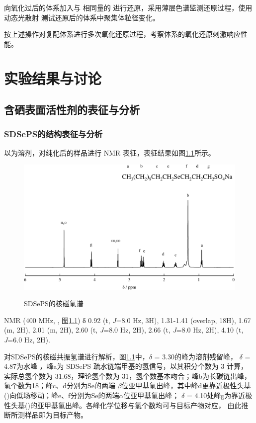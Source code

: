 \documentclass[bachelor,fandolfonts,replaceperiod]{jnuthesis}
\begin{document}
    向氧化过后的体系加入与  相同量的  进行还原，采用薄层色谱监测还原过程，使用动态光散射
    测试还原后的体系中聚集体粒径变化。
    
    按上述操作对复配体系进行多次氧化还原过程，考察体系的氧化还原刺激响应性能。
    
    \chapter{实验结果与讨论}\label{chapter:results}
    \section{含硒表面活性剂的表征与分析}
    \subsection{SDSePS的结构表征与分析}
    以为溶剂，对纯化后的样品进行 NMR 表征，表征结果如图\ref{fig:SDSePS-nmr}所示。
    \begin{figure}[htbp]
        \centering
        \includegraphics[width=.75\textwidth]{figure/SDSePS-nmr.pdf}\\
        \caption{SDSePS的核磁氢谱}\label{fig:SDSePS-nmr}
    \end{figure}
     
     NMR (400 MHz, , 图\ref{fig:SDSePS-nmr}) δ 0.92 (t, \textit{J}=8.0 Hz, 3H), 1.31-1.41 (overlap, 18H), 
    1.67 (m, 2H), 2.01 (m, 2H), 2.60 (t, \textit{J}=8.0 Hz, 2H), 2.66 (t, \textit{J}=8.0 Hz, 2H),  4.10 (t, \textit{J}=6.0 Hz, 2H).
    
    对SDSePS的核磁共振氢谱进行解析，图\ref{fig:SDSePS-nmr}中，$\delta$ = 3.30的峰为溶剂残留峰，
    $\delta$ = 4.87为水峰\cite{波谱解析} ，峰a为 SDSePS 疏水链端甲基的氢信号，以其积分个数为 3 计算，
    实际总氢个数为 31.68，理论氢个数为 31，氢个数基本吻合；峰b为长碳链出峰，氢个数为18；峰c、d分别为Se的两端
    $\beta$位亚甲基氢出峰，其中峰d更靠近极性头基()向低场移动；峰e、f分别为Se的两端$\alpha$位亚甲基氢出峰；
    $\delta$ = 4.10处峰g为靠近极性头基()的亚甲基氢出峰。各峰化学位移与氢个数均可与目标产物对应，
    由此推断所测样品即为目标产物。
    
\end{document}
